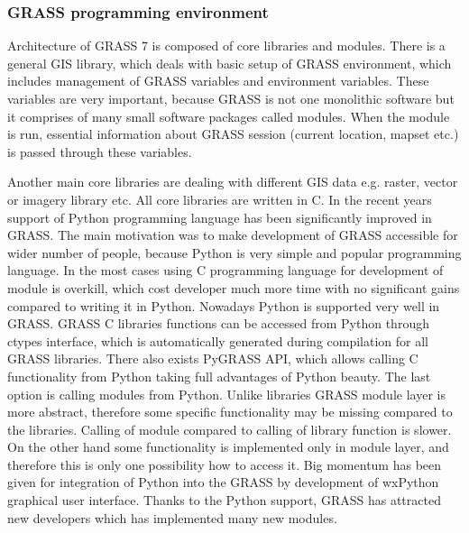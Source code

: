 \documentclass[a4paper,12pt]{article}
\begin{document}
\subsubsection{GRASS programming  environment}




Architecture of GRASS 7 is composed of core libraries and modules. There is a general GIS library, which 
deals with basic setup of GRASS environment, which includes management of
GRASS variables and environment variables. These variables are very important, because GRASS is not one monolithic software 
but it comprises of many small software packages called modules. When the module is run, essential information 
about GRASS session (current location, mapset etc.) is passed through these variables. 

Another main core libraries are dealing with different GIS data e.g. raster, vector or imagery library etc. 
All core libraries are written in C. In the recent years support of Python programming language has been significantly 
improved in GRASS. The main motivation was to make development of GRASS accessible for wider number 
of people, because Python is very simple and popular programming language. In the most cases using 
C programming language for development of module is overkill, which cost developer much more time 
with no significant gains compared to writing it in Python. Nowadays Python is supported very well in GRASS.
GRASS C libraries functions can be accessed from Python through ctypes interface, which is automatically generated during compilation
for all GRASS libraries.  
There also exists 
PyGRASS API, which allows calling C functionality from Python taking full advantages of Python beauty.
The last option is calling modules from Python. Unlike libraries GRASS module layer is more abstract, 
therefore some specific functionality may be missing compared to the libraries. Calling of module
compared to calling of library function is slower.
On the other hand some functionality is implemented
only in module layer, and therefore this is only one possibility how to access it.
Big momentum has been given for integration of Python into the GRASS by development of wxPython graphical
user interface. 
Thanks to the Python support, GRASS has attracted new developers which has implemented many new modules.
\end{document}
